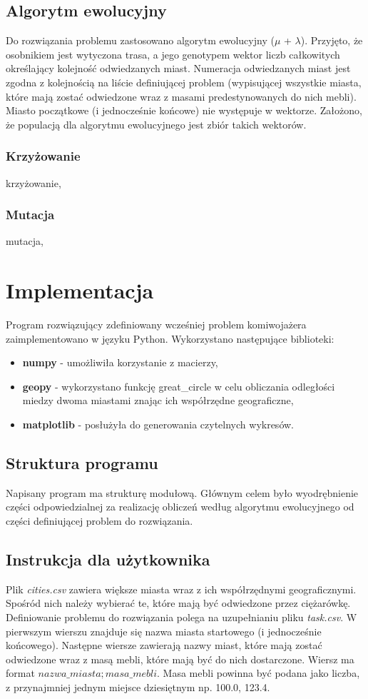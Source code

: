 \documentclass[12pt, oneside, final]{report}
\begin{document}
\section{Algorytm ewolucyjny}
Do rozwiązania problemu zastosowano algorytm ewolucyjny ($\mu$ + $\lambda$). Przyjęto, że osobnikiem jest wytyczona trasa, a jego genotypem wektor liczb całkowitych określający kolejność odwiedzanych miast. Numeracja odwiedzanych miast jest zgodna z kolejnością na liście definiującej problem (wypisującej wszystkie miasta, które mają zostać odwiedzone wraz z masami predestynowanych do nich mebli). Miasto początkowe (i jednocześnie końcowe) nie występuje w wektorze. Założono, że populacją dla algorytmu ewolucyjnego jest zbiór takich wektorów.

\subsection{Krzyżowanie}
krzyżowanie,
\subsection{Mutacja}
mutacja,

\chapter{Implementacja}
Program rozwiązujący zdefiniowany wcześniej problem komiwojażera zaimplementowano w języku Python. Wykorzystano następujące biblioteki:
\begin{itemize}
\item \textbf{numpy} - umożliwiła korzystanie z macierzy,
\item \textbf{geopy} - wykorzystano funkcję great\_circle w celu obliczania odległości miedzy dwoma miastami znając ich współrzędne geograficzne,
\item \textbf{matplotlib} - posłużyła do generowania czytelnych wykresów.
\end{itemize}

\section{Struktura programu}
Napisany program ma strukturę modułową. Głównym celem było wyodrębnienie części odpowiedzialnej za realizację obliczeń według algorytmu ewolucyjnego od części definiującej problem do rozwiązania.

\section{Instrukcja dla użytkownika}
Plik \textit{cities.csv} zawiera większe miasta wraz z ich współrzędnymi geograficznymi. Spośród nich należy wybierać te, które mają być odwiedzone przez ciężarówkę. Definiowanie problemu do rozwiązania polega na uzupełnianiu pliku \textit{task.csv}. W pierwszym wierszu znajduje się nazwa miasta startowego (i jednocześnie końcowego). Następne wiersze zawierają nazwy miast, które mają zostać odwiedzone wraz z masą mebli, które mają być do nich dostarczone. Wiersz ma format $nazwa\_miasta;masa\_mebli$. Masa mebli powinna być podana jako liczba, z przynajmniej jednym miejsce dziesiętnym np. 100.0, 123.4.
\end{document}
